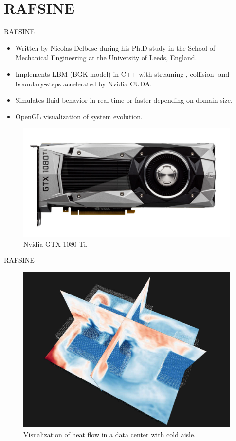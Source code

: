 \documentclass{beamer}
\begin{document}
\section{RAFSINE}
\begin{frame}{RAFSINE}

\begin{itemize}
\item Written by Nicolas Delbosc during his Ph.D study in the School of Mechanical Engineering at the
University of Leeds, England.
\item Implements LBM (BGK model) in C++ with streaming-, collision- and boundary-steps accelerated by Nvidia CUDA.
\item Simulates fluid behavior in real time or faster depending on domain size.
\item OpenGL visualization of system evolution.
\end{itemize}

\begin{figure}[ht]
\begin{center}
\includegraphics[width=0.5\linewidth]{1080ti.jpg}
\end{center}
\caption{Nvidia GTX 1080 Ti.}
\end{figure}

\end{frame}

\begin{frame}{RAFSINE}

\begin{figure}[ht]
\begin{center}
\includegraphics[width=0.9\linewidth]{rafsine_problem1.jpg}
\end{center}
\caption{Visualization of heat flow in a data center with cold aisle.}
\label{fig:problem2}
\end{figure}

\end{frame}
\end{document}
